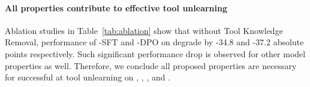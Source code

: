     


\paragraph{All properties contribute to effective tool unlearning}
Ablation studies in Table~\ref{tab:ablation} show that without Tool Knowledge Removal, performance of \method-SFT and \method-DPO on \tf degrade by -34.8 and -37.2 absolute points respectively. Such significant performance drop is observed for other model properties as well. Therefore, we conclude all proposed properties are necessary for successful at tool unlearning on \ttest, \tr, \tf, and \tg. 



